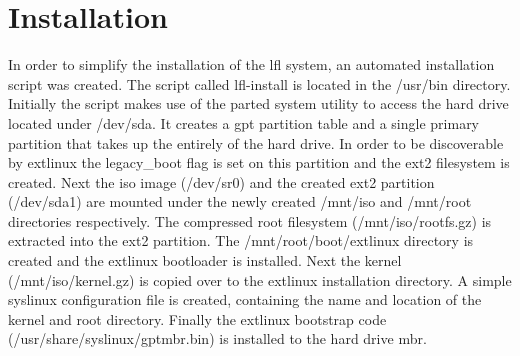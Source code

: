 \section{Installation}\label{Installation}

In order to simplify the installation of the \gls{lfl} system, an automated installation script was created. The script called lfl-install is located in the /usr/bin directory. Initially the script makes use of the parted system utility to access the hard drive located under /dev/sda. It creates a \gls{gpt} partition table and a single primary partition that takes up the entirely of the hard drive. In order to be discoverable by extlinux the legacy\_boot flag is set on this partition and the ext2 filesystem is created. Next the \gls{iso} image (/dev/sr0) and the created ext2 partition (/dev/sda1) are mounted under the newly created /mnt/iso and /mnt/root directories respectively. The compressed root filesystem (/mnt/iso/rootfs.gz) is extracted into the ext2 partition. The /mnt/root/boot/extlinux directory is created and the extlinux bootloader is installed. Next the kernel (/mnt/iso/kernel.gz) is copied over to the extlinux installation directory. A simple syslinux configuration file is created, containing the name and location of the kernel and root directory. Finally the extlinux bootstrap code (/usr/share/syslinux/gptmbr.bin) is installed to the hard drive \gls{mbr}.
